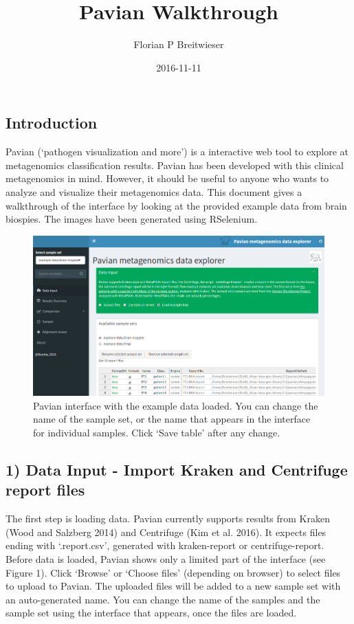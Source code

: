 \documentclass[]{article}
\title{Pavian Walkthrough}
\author{Florian P Breitwieser}
\date{2016-11-11}
\begin{document}
\maketitle

{
\setcounter{tocdepth}{2}
\tableofcontents
}
\subsection{Introduction}\label{introduction}

Pavian (`pathogen visualization and more') is a interactive web tool to
explore at metagenomics classification results. Pavian has been
developed with this clinical metagenomics in mind. However, it should be
useful to anyone who wants to analyze and visualize their metagenomics
data. This document gives a walkthrough of the interface by looking at
the provided example data from brain biospies. The images have been
generated using RSelenium.

\begin{figure}[htbp]
\centering
\includegraphics{load-data-set.png}
\caption{Pavian interface with the example data loaded. You can change
the name of the sample set, or the name that appears in the interface
for individual samples. Click `Save table' after any change.}
\end{figure}

\subsection{1) Data Input - Import Kraken and Centrifuge report
files}\label{data-input---import-kraken-and-centrifuge-report-files}

The first step is loading data. Pavian currently supports results from
Kraken (Wood and Salzberg 2014) and Centrifuge (Kim et al. 2016). It
expects files ending with `.report.csv', generated with kraken-report or
centrifuge-report. Before data is loaded, Pavian shows only a limited
part of the interface (see Figure 1). Click `Browse' or `Choose files'
(depending on browser) to select files to upload to Pavian. The uploaded
files will be added to a new sample set with an auto-generated name. You
can change the name of the samples and the sample set using the
interface that appears, once the files are loaded.
\end{document}
